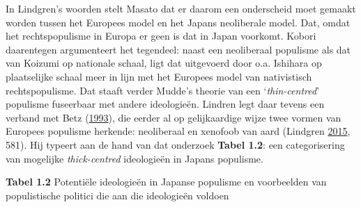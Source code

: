 \documentclass[10.5pt,dutch,]{article}
\begin{document}
In Lindgren's woorden stelt Masato dat er daarom een onderscheid moet
gemaakt worden tussen het Europees model en het Japans neoliberale
model. Dat, omdat het rechtspopulisme in Europa er geen is dat in Japan
voorkomt. Kobori daarentegen argumenteert het tegendeel: naast een
neoliberaal populisme als dat van Koizumi op nationale schaal, ligt dat
uitgevoerd door o.a. Ishihara op plaatselijke schaal meer in lijn met
het Europees model van nativistisch rechtspopulisme. Dat staaft verder
Mudde's theorie van een `\emph{thin-centred}' populisme fuseerbaar met
andere ideologieën. Lindren legt daar tevens een verband met Betz
(\protect\hyperlink{ref-betzux5ftwoux5f1993}{1993}), die eerder al op
gelijkaardige wijze twee vormen van Europees populisme herkende:
neoliberaal en xenofoob van aard (Lindgren
\protect\hyperlink{ref-lindgrenux5fdevelopingux5f2015}{2015}, 581). Hij
typeert aan de hand van dat onderzoek \textbf{Tabel 1.2}: een
categorisering van mogelijke \emph{thick-centred} ideologieën in Japans
populisme.

\textbf{Tabel 1.2} Potentiële ideologieën in Japanse populisme en
voorbeelden van populistische politici die aan die ideologieën voldoen
\end{document}
